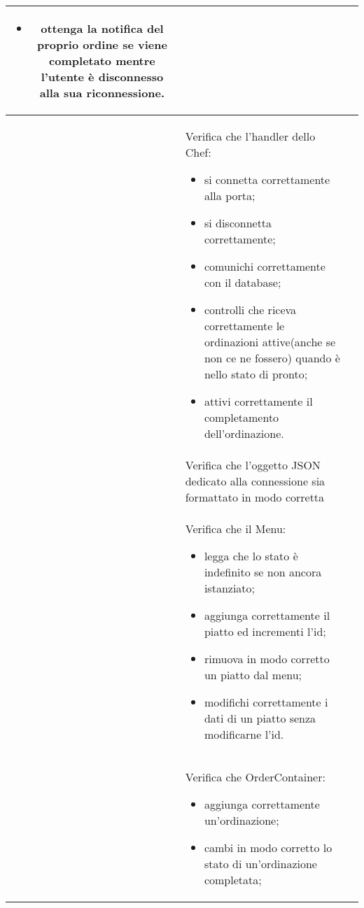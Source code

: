 \begin{longtable}{|c|P{9cm}|c|}
\begin{itemize}
	 	\item ottenga la notifica del proprio ordine se viene completato mentre l'utente è disconnesso alla sua riconnessione.
	 \end{itemize}
	  \\
	 \hline{}\label{tu-chefhandler} & Verifica che l'handler dello Chef:
	 \begin{itemize}
	 	\item si connetta correttamente alla porta;
	 	\item si disconnetta correttamente;
	 	\item comunichi correttamente con il database;
	 	\item controlli che riceva correttamente le ordinazioni attive(anche se non ce ne fossero) quando è nello stato di pronto;
	 	\item attivi correttamente il completamento dell'ordinazione.
	 \end{itemize}
 	 \\
	\hline{}\label{tu-json} & Verifica che l'oggetto JSON dedicato alla connessione sia formattato in modo corretta  \\
	\hline {} & Verifica che il Menu:
	\begin{itemize}
		\item legga che lo stato è indefinito se non ancora istanziato;
		\item aggiunga correttamente il piatto ed incrementi l'id;
		\item rimuova in modo corretto un piatto dal menu;
		\item modifichi correttamente i dati di un piatto senza modificarne l'id.
	\end{itemize}
	 \\
	\hline {} & Verifica che OrderContainer:
	\begin{itemize}
		\item aggiunga correttamente un'ordinazione;
		\item cambi in modo corretto lo stato di un'ordinazione completata;

\end{itemize}
\end{longtable}
